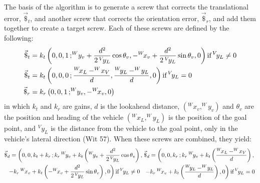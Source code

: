 \documentclass[mla7]{mla}
\begin{document}
\begin{paper}
The basis of the algorithm is to generate a screw that corrects the translational error, $\vec{\$}_t$, and another screw that corrects the orientation error, $\vec{\$}_r$, and add them together to create a target screw. Each of these screws are defined by the following:
\begin{subequations}
\begin{align}
\vec{\$}_t&=k_t\left( 0,0,1\,; ^W\!y_v+\frac{d^2}{2\,^V\!y_L}\cos{\theta_v}, -^W\!x_v+\frac{d^2}{2\,^V\!y_L}\sin{\theta_v}, 0 \right) \text{if\,} ^V\!y_L\neq0 \\
\vec{\$}_t&=k_t\left( 0,0,0\,; \frac{^W\!x_L-^W\!x_V}{d}, \frac{^W\!y_L-^W\!y_L}{d}, 0 \right) \text{if\,} ^V\!y_L=0 \\
\vec{\$}_r&=k_r\left( 0,0,1\,; ^W\!y_v, -^W\!x_v, 0 \right)
\end{align}
\end{subequations}
in which $k_t$ and $k_r$ are gains, $d$ is the lookahead distance, $(^W\!x_v,^W\!y_v)$ and $\theta_v$ are the position and heading of the vehicle $(^W\!x_L,^W\!y_L)$ is the position of the goal point, and $^V\!y_L$ is the distance from the vehicle to the goal point, only in the vehicle's lateral direction (Wit 57). When these screws are combined, they yield:
\begin{subequations}
\begin{multline}
\vec{\$}_d=\left( 0,0,k_t+k_r\,; k_r\,^W\!y_v + k_t \left( ^W\!y_v+\frac{d^2}{2\,^V\!y_L}\cos{\theta_v} \right), \right. \\ \left. -k_r\,^W\!x_v + k_t \left( -^W\!x_v+\frac{d^2}{2\,^V\!y_L}\sin{\theta_v} \right), 0 \right) \text{if\,} ^V\!y_L\neq0
\end{multline}
\begin{multline}
\vec{\$}_d=\left( 0,0,k_r\,; k_r\,^W\!y_v + k_t \left( \frac{^W\!x_L-^W\!x_V}{d} \right), \right. \\ \left. -k_r\,^W\!x_v + k_t \left( \frac{^W\!y_L-^W\!y_L}{d} \right), 0 \right) \text{if\,} ^V\!y_L=0
\end{multline}
\end{subequations}


\end{paper}
\end{document}
